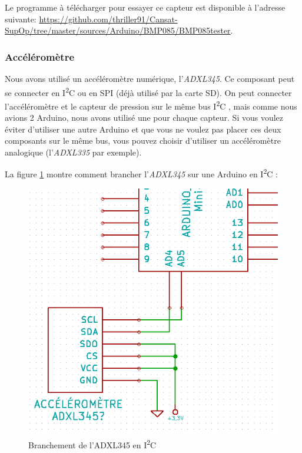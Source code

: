 \documentclass[twocolumn, 8pt]{article}
\newcommand\IdC{I\textsuperscript{2}C }
\begin{document}
\par Le programme à télécharger pour essayer ce capteur est disponible à l'adresse suivante: \url{https://github.com/thriller91/Cansat-SupOp/tree/master/sources/Arduino/BMP085/BMP085tester}.

\subsubsection{Accéléromètre}
\par Nous avons utilisé un accéléromètre numérique, l'\emph{ADXL345}. Ce composant peut se connecter en \IdC ou en SPI (déjà utilisé par la carte SD). On peut connecter l'accéléromètre et le capteur de pression sur le même bus \IdC, mais comme nous avions 2 Arduino, nous avons utilisé une pour chaque capteur. Si vous voulez éviter d'utiliser une autre Arduino et que vous ne voulez pas placer ces deux composants sur le même bus, vous pouvez choisir d'utiliser un accéléromètre analogique (l'\emph{ADXL335} par exemple).

\par La figure \ref{ADXL345} montre comment brancher l'\emph{ADXL345} sur une Arduino en \IdC:

\begin{figure}[!h]
	\centering
	\includegraphics[scale=.25]{ADXL345.png}
	\caption{Branchement de l'ADXL345 en \IdC}
	\label{ADXL345}
\end{figure}
\end{document}
